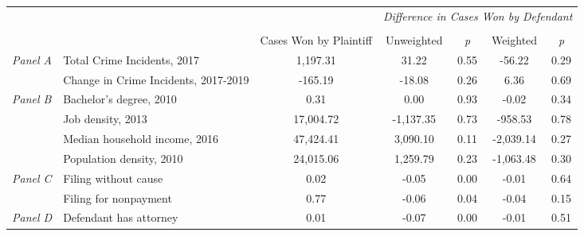 \begin{tabular}{llccccc}
\toprule
 &  & \textit{} & \multicolumn{4}{c}{\textit{Difference in Cases Won by Defendant}} \\
\cline{4-7}
\\
 &  & Cases Won by Plaintiff & Unweighted & \emph{p} & Weighted & \emph{p} \\
\midrule
\multirow[c]{2}{.75cm}{\textit{Panel A}} & Total Crime Incidents, 2017 & 1,197.31 & 31.22 & 0.55 & -56.22 & 0.29 \\
 & Change in Crime Incidents, 2017-2019 & -165.19 & -18.08 & 0.26 & 6.36 & 0.69 \\
\cline{1-7}
\multirow[c]{4}{.75cm}{\textit{Panel B}} & Bachelor's degree, 2010 & 0.31 & 0.00 & 0.93 & -0.02 & 0.34 \\
 & Job density, 2013 & 17,004.72 & -1,137.35 & 0.73 & -958.53 & 0.78 \\
 & Median household income, 2016 & 47,424.41 & 3,090.10 & 0.11 & -2,039.14 & 0.27 \\
 & Population density, 2010 & 24,015.06 & 1,259.79 & 0.23 & -1,063.48 & 0.30 \\
\cline{1-7}
\multirow[c]{2}{.75cm}{\textit{Panel C}} & Filing without cause & 0.02 & -0.05 & 0.00 & -0.01 & 0.64 \\
 & Filing for nonpayment & 0.77 & -0.06 & 0.04 & -0.04 & 0.15 \\
\cline{1-7}
\textit{Panel D} & Defendant has attorney & 0.01 & -0.07 & 0.00 & -0.01 & 0.51 \\
\cline{1-7}
\bottomrule
\end{tabular}
